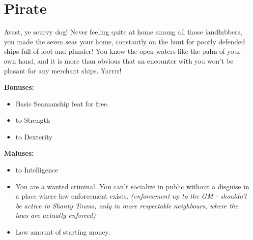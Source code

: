 \section{Pirate}
Avast, ye scurvy dog! Never feeling quite at home among all those landlubbers, you made the seven seas your home, constantly on the hunt for poorly defended ships full of loot and plunder! You know the open waters like the palm of your own hand, and it is more than obvious that an encounter with you won't be plasant for any merchant ships. Yarrrr!


\textbf{Bonuses:}
\begin{itemize}
	\item Basic Seamanship feat for free.
	\item {} to Strength
	\item {} to Dexterity
\end{itemize}
\textbf{Maluses:}
\begin{itemize}
	\item {} to Intelligence
	\item You are a wanted criminal. You can't socialize in public without a disguise in a place where law enforcement exists. \textit{(enforcement up to the GM - shouldn't be active in Shanty Towns, only in more respectable neighbours, where the laws are actually enforced)}
	\item Low amount of starting money.
\end{itemize}
